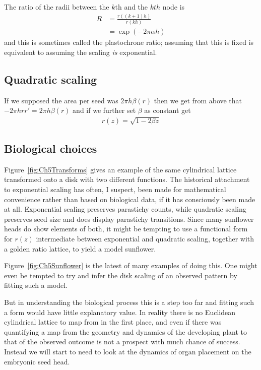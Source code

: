 The ratio of the radii between the $k$th and the $kth$ node is 
\begin{align}
R &= \frac{r((k+1) h)}{ r(kh)} 
\\
&= \exp (-2 \pi \alpha h) \label{eq:plastoratio}
\end{align}
and this is sometimes called the plastochrone ratio; assuming that this is fixed is equivalent to assuming the scaling \textit{is} exponential. 



\subsection{Quadratic scaling}
 If we supposed the area per seed was $2 \pi h \beta (r)$ then we get from above that $-2\pi h  r r'=2\pi h \beta (r)$ and if we further set $\beta$ as constant get
\begin{align}
	r(z) = \sqrt{ 1- 2\beta z } 
\end{align}
 
\clearpage


\subsection{Biological choices}
 Figure~\ref{fig:Ch5Transforms} gives an example of the same cylindrical lattice transformed onto a disk with two different functions.
The historical attachment to exponential scaling has often, I suspect, been made for mathematical convenience rather than based on biological data, if it has consciously been made at all. Exponential scaling   preserves parastichy counts, while quadratic scaling preserves seed size and does display parastichy transitions. Since many sunflower heads do show elements of both, it might be tempting to use a functional form for $r(z)$ intermediate between exponential and quadratic scaling, together with a golden ratio lattice, to yield a model sunflower. 

Figure~\ref{fig:Ch5Sunflower} is the latest of many examples of doing this. One might even be tempted to try and infer the disk scaling of an observed pattern by fitting such a model. 

But in understanding the biological process this is a step too far and fitting such a form would have little explanatory value. In  reality there is no Euclidean cylindrical lattice to map from in the first place, and even if there was quantifying a map from the geometry and dynamics of the developing plant to that of the observed outcome is not a prospect with much chance of success. Instead we will start to need to look at the dynamics of organ placement on the embryonic seed head.  

